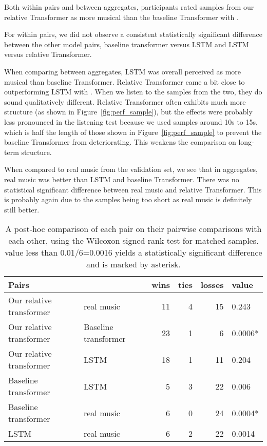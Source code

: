 \documentclass{article} \usepackage{iclr2019_conference,times}
\begin{document}
Both within pairs and between aggregates, participants rated samples from our relative Transformer as more musical than the baseline Transformer with . 

For within pairs, we did not observe a consistent statistically significant difference between the other model pairs, baseline transformer versus LSTM and LSTM versus relative Transformer.  

When comparing between aggregates, LSTM was overall perceived as more musical than baseline Transformer.  Relative Transformer came a bit close to outperforming LSTM with .  When we listen to the samples from the two, they do sound qualitatively different.   Relative Transformer often exhibits much more structure (as shown in Figure~\ref{fig:perf_sample}), but the effects were probably less pronounced in the listening test because we used samples around 10s to 15s, which is half the length of those shown in Figure~\ref{fig:perf_sample} to prevent the baseline Transformer from deteriorating.  This weakens the comparison on long-term structure.  


When compared to real music from the validation set, we see that in aggregates, real music was better than LSTM and baseline Transformer.  There was no statistical significant difference between real music and relative Transformer.  This is probably again due to the samples being too short as real music is definitely still better.


\begin{table}[h]
  \caption{A post-hoc comparison of each pair on their pairwise comparisons with each other, using the Wilcoxon signed-rank test for matched samples.  value less than 0.01/6=0.0016 yields a statistically significant difference and is marked by asterisk.}
  \label{table:listening_pairs}
  \centering
  \begin{tabular}{llrrrl}
    \toprule
    Pairs     & & wins & ties & losses &  value      \\
    \midrule
Our relative transformer & real music & 11 & 4 & 15 & 0.243\\
Our relative transformer & Baseline transformer & 23 & 1 & 6 &  0.0006*\\
Our relative transformer & LSTM  & 18 & 1 & 11 & 0.204 \\
Baseline transformer & LSTM & 5 & 3 & 22 & 0.006 \\
Baseline transformer & real music & 6 & 0 & 24 & 0.0004*  \\
LSTM & real music & 6 & 2 & 22 & 0.0014 \\
  
    \bottomrule
  \end{tabular}
\end{table}
\end{document}
